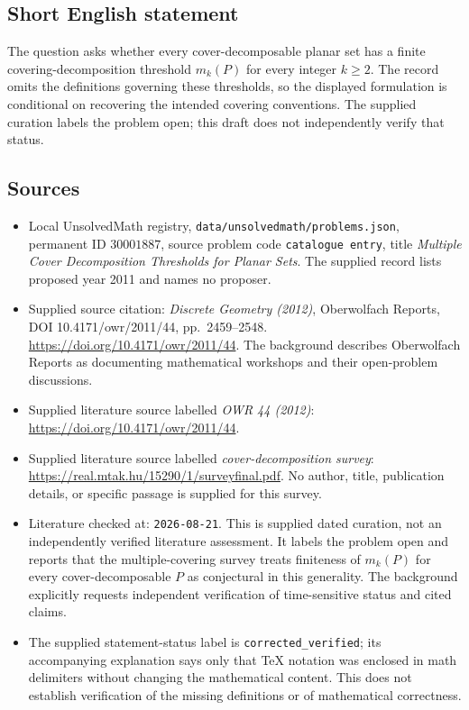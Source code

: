 \documentclass[11pt]{article}
\begin{document}
\subsection{Short English statement}
The question asks whether every cover-decomposable planar set has a finite covering-decomposition threshold \(m_k(P)\) for every integer \(k\geq2\). The record omits the definitions governing these thresholds, so the displayed formulation is conditional on recovering the intended covering conventions. The supplied curation labels the problem open; this draft does not independently verify that status.
\subsection{Sources}
\begin{itemize}
\item Local UnsolvedMath registry, \texttt{data/unsolvedmath/problems.json}, permanent ID \(30001887\), source problem code \texttt{catalogue entry}, title \emph{Multiple Cover Decomposition Thresholds for Planar Sets}. The supplied record lists proposed year 2011 and names no proposer.
\item Supplied source citation: \emph{Discrete Geometry (2012)}, Oberwolfach Reports, DOI 10.4171/owr/2011/44, pp.\ 2459--2548. \url{https://doi.org/10.4171/owr/2011/44}. The background describes Oberwolfach Reports as documenting mathematical workshops and their open-problem discussions.
\item Supplied literature source labelled \emph{OWR 44 (2012)}: \url{https://doi.org/10.4171/owr/2011/44}.
\item Supplied literature source labelled \emph{cover-decomposition survey}: \url{https://real.mtak.hu/15290/1/surveyfinal.pdf}. No author, title, publication details, or specific passage is supplied for this survey.
\item Literature checked at: \texttt{2026-08-21}. This is supplied dated curation, not an independently verified literature assessment. It labels the problem open and reports that the multiple-covering survey treats finiteness of \(m_k(P)\) for every cover-decomposable \(P\) as conjectural in this generality. The background explicitly requests independent verification of time-sensitive status and cited claims.
\item The supplied statement-status label is \texttt{corrected\_verified}; its accompanying explanation says only that TeX notation was enclosed in math delimiters without changing the mathematical content. This does not establish verification of the missing definitions or of mathematical correctness.
\end{itemize}
\end{document}
